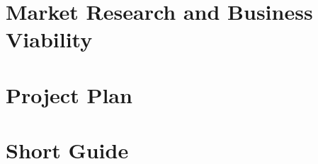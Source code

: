 \documentclass[12pt]{article}
\begin{document}
\section{Market Research and Business Viability}


\section{Project Plan}


\section{Short Guide}


\newpage

\printbibliography

\newpage

\begin{appendices}
    
\end{appendices}
\end{document}

